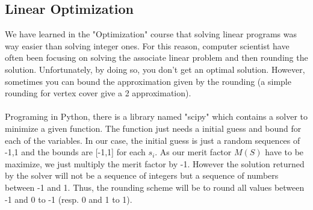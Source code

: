 \documentclass[a4paper,11pt,openany]{article}
\begin{document}
\subsection{Linear Optimization}
\label{linear_optim}
\noindent
We have learned in the "Optimization" course that solving linear programs was way easier than solving integer ones. For this reason, computer scientist have often been focusing on solving the associate linear problem and then rounding the solution. Unfortunately, by doing so, you don't get an optimal solution. However, sometimes you can bound the approximation given by the rounding (a simple rounding for vertex cover give a 2 approximation).\\\\
Programing in Python, there is a library named "scipy" which contains a solver to minimize a given function. The function just needs a initial guess and bound for each of the variables. In our case, the initial guess is just a random sequences of {-1,1} and the bounds are [-1,1] for each $s_i$. As our merit factor $M(S)$ have to be maximize, we just multiply the merit factor by -1. However the solution returned by the solver will not be a sequence of integers but a sequence of numbers between -1 and 1. Thus, the rounding scheme will be to round all values between -1 and 0 to -1 (resp. 0 and 1 to 1). \\\\
\end{document}
